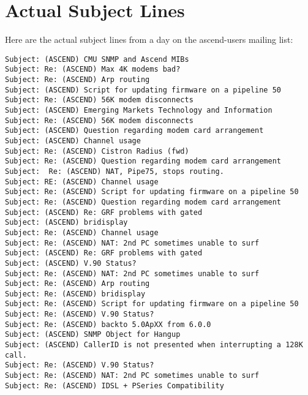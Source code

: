 

\appendix


\chapter{Actual Subject Lines}
\label{cha:subject-appendix}
Here are the actual subject lines from a day on the ascend-users mailing list:

\begin{verbatim}
Subject: (ASCEND) CMU SNMP and Ascend MIBs
Subject: Re: (ASCEND) Max 4K modems bad?
Subject: Re: (ASCEND) Arp routing
Subject: (ASCEND) Script for updating firmware on a pipeline 50
Subject: Re: (ASCEND) 56K modem disconnects
Subject: (ASCEND) Emerging Markets Technology and Information
Subject: Re: (ASCEND) 56K modem disconnects
Subject: (ASCEND) Question regarding modem card arrangement
Subject: (ASCEND) Channel usage
Subject: Re: (ASCEND) Cistron Radius (fwd)
Subject: Re: (ASCEND) Question regarding modem card arrangement
Subject:  Re: (ASCEND) NAT, Pipe75, stops routing.
Subject: RE: (ASCEND) Channel usage
Subject: Re: (ASCEND) Script for updating firmware on a pipeline 50
Subject: Re: (ASCEND) Question regarding modem card arrangement
Subject: (ASCEND) Re: GRF problems with gated
Subject: (ASCEND) bridisplay
Subject: Re: (ASCEND) Channel usage
Subject: Re: (ASCEND) NAT: 2nd PC sometimes unable to surf
Subject: (ASCEND) Re: GRF problems with gated
Subject: (ASCEND) V.90 Status?
Subject: Re: (ASCEND) NAT: 2nd PC sometimes unable to surf
Subject: Re: (ASCEND) Arp routing
Subject: Re: (ASCEND) bridisplay
Subject: Re: (ASCEND) Script for updating firmware on a pipeline 50
Subject: Re: (ASCEND) V.90 Status?
Subject: Re: (ASCEND) backto 5.0ApXX from 6.0.0
Subject: (ASCEND) SNMP Object for Hangup
Subject: (ASCEND) CallerID is not presented when interrupting a 128K call.
Subject: Re: (ASCEND) V.90 Status?
Subject: Re: (ASCEND) NAT: 2nd PC sometimes unable to surf
Subject: Re: (ASCEND) IDSL + PSeries Compatibility
\end{verbatim}


